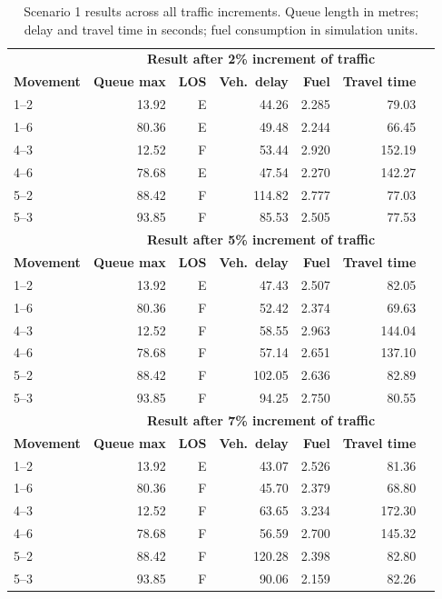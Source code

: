\documentclass[11pt]{article}
\begin{document}
\begin{table}[H]
  \centering
  \footnotesize
  \caption{Scenario 1 results across all traffic increments. Queue length in metres; delay and travel
  time in seconds; fuel consumption in simulation units.}
  \label{tab:scenario1all}
  \begin{tabular}{@{}lrrrrrr@{}}
    \toprule
    & \multicolumn{6}{c}{\textbf{Result after 2\% increment of traffic}} \\
    \textbf{Movement} & \textbf{Queue max} & \textbf{LOS} & \textbf{Veh.\ delay} & \textbf{Fuel} & \textbf{Travel time} \\
    \midrule
    1--2 & 13.92 & E & 44.26  & 2.285 & 79.03 \\
    1--6 & 80.36 & E & 49.48  & 2.244 & 66.45 \\
    4--3 & 12.52 & F & 53.44  & 2.920 & 152.19 \\
    4--6 & 78.68 & E & 47.54  & 2.270 & 142.27 \\
    5--2 & 88.42 & F & 114.82 & 2.777 & 77.03 \\
    5--3 & 93.85 & F & 85.53  & 2.505 & 77.53 \\
    \midrule
    & \multicolumn{6}{c}{\textbf{Result after 5\% increment of traffic}} \\
    \textbf{Movement} & \textbf{Queue max} & \textbf{LOS} & \textbf{Veh.\ delay} & \textbf{Fuel} & \textbf{Travel time} \\
    \midrule
    1--2 & 13.92 & E & 47.43 & 2.507 & 82.05 \\
    1--6 & 80.36 & F & 52.42 & 2.374 & 69.63 \\
    4--3 & 12.52 & F & 58.55 & 2.963 & 144.04 \\
    4--6 & 78.68 & F & 57.14 & 2.651 & 137.10 \\
    5--2 & 88.42 & F & 102.05 & 2.636 & 82.89 \\
    5--3 & 93.85 & F & 94.25 & 2.750 & 80.55 \\
    \midrule
    & \multicolumn{6}{c}{\textbf{Result after 7\% increment of traffic}} \\
    \textbf{Movement} & \textbf{Queue max} & \textbf{LOS} & \textbf{Veh.\ delay} & \textbf{Fuel} & \textbf{Travel time} \\
    \midrule
    1--2 & 13.92 & E & 43.07  & 2.526 & 81.36 \\
    1--6 & 80.36 & F & 45.70  & 2.379 & 68.80 \\
    4--3 & 12.52 & F & 63.65  & 3.234 & 172.30 \\
    4--6 & 78.68 & F & 56.59  & 2.700 & 145.32 \\
    5--2 & 88.42 & F & 120.28 & 2.398 & 82.80 \\
    5--3 & 93.85 & F & 90.06  & 2.159 & 82.26 \\
    \bottomrule
  \end{tabular}
\end{table}
\end{document}
